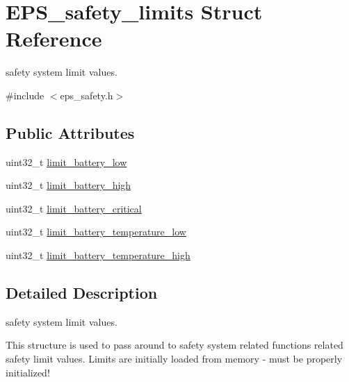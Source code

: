 \hypertarget{struct_e_p_s__safety__limits}{\section{E\-P\-S\-\_\-safety\-\_\-limits Struct Reference}
\label{struct_e_p_s__safety__limits}
}


safety system limit values.  




{\ttfamily \#include $<$eps\-\_\-safety.\-h$>$}

\subsection*{Public Attributes}
\begin{DoxyCompactItemize}
\item 
uint32\-\_\-t \hyperlink{struct_e_p_s__safety__limits_aa7d1e0bc82ec3f5fb8f879ba1b8ebcef}{limit\-\_\-battery\-\_\-low}
\item 
uint32\-\_\-t \hyperlink{struct_e_p_s__safety__limits_a158a30d24036f68a9ecadce30c75e619}{limit\-\_\-battery\-\_\-high}
\item 
uint32\-\_\-t \hyperlink{struct_e_p_s__safety__limits_a2e17c5ab10147b9d067fd1e5cb187edd}{limit\-\_\-battery\-\_\-critical}
\item 
uint32\-\_\-t \hyperlink{struct_e_p_s__safety__limits_a2395c833f98b5c3df23b252719b85097}{limit\-\_\-battery\-\_\-temperature\-\_\-low}
\item 
uint32\-\_\-t \hyperlink{struct_e_p_s__safety__limits_a39027034504fbe06a380c1bf045c5fd0}{limit\-\_\-battery\-\_\-temperature\-\_\-high}
\end{DoxyCompactItemize}


\subsection{Detailed Description}
safety system limit values. 

This structure is used to pass around to safety system related functions related safety limit values. Limits are initially loaded from memory -\/ must be properly initialized! 


